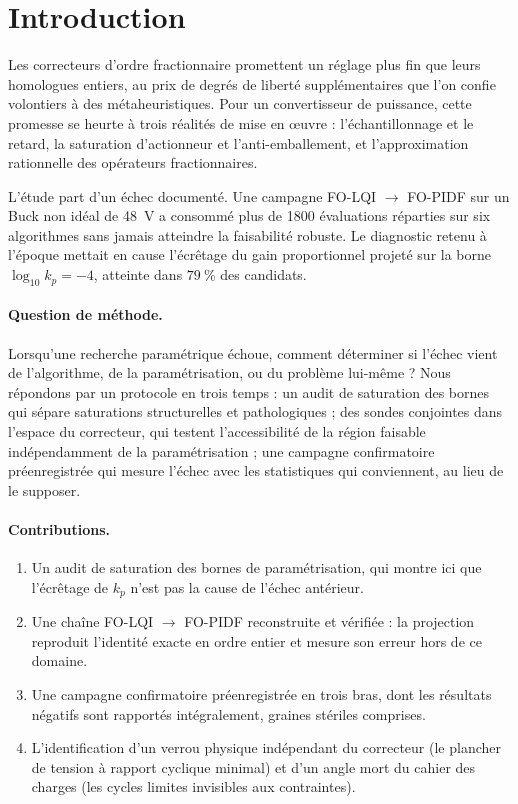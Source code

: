 \section{Introduction}
\label{sec:intro}

Les correcteurs d'ordre fractionnaire promettent un réglage plus fin que leurs
homologues entiers, au prix de degrés de liberté supplémentaires que l'on
confie volontiers à des métaheuristiques. Pour un convertisseur de puissance,
cette promesse se heurte à trois réalités de mise en œuvre : l'échantillonnage
et le retard, la saturation d'actionneur et l'anti-emballement, et
l'approximation rationnelle des opérateurs fractionnaires.

L'étude part d'un échec documenté. Une campagne FO-LQI $\to$ FO-PIDF sur un
Buck non idéal de 48~V a consommé plus de 1800 évaluations réparties sur six
algorithmes sans jamais atteindre la faisabilité robuste. Le diagnostic
retenu à l'époque mettait en cause l'écrêtage du gain proportionnel projeté
sur la borne $\log_{10}k_p=-4$, atteinte dans $79~\%$ des candidats.

\paragraph{Question de méthode.}
Lorsqu'une recherche paramétrique échoue, comment déterminer si l'échec
vient de l'algorithme, de la paramétrisation, ou du problème lui-même ? Nous
répondons par un protocole en trois temps : un audit de saturation des bornes
qui sépare saturations structurelles et pathologiques ; des sondes conjointes
dans l'espace du correcteur, qui testent l'accessibilité de la région
faisable indépendamment de la paramétrisation ; une campagne confirmatoire
préenregistrée qui mesure l'échec avec les statistiques qui conviennent, au
lieu de le supposer.

\paragraph{Contributions.}
\begin{enumerate}
\item Un audit de saturation des bornes de paramétrisation, qui montre ici
  que l'écrêtage de $k_p$ n'est pas la cause de l'échec antérieur.
\item Une chaîne FO-LQI $\to$ FO-PIDF reconstruite et vérifiée : la
  projection reproduit l'identité exacte en ordre entier et mesure son
  erreur hors de ce domaine.
\item Une campagne confirmatoire préenregistrée en trois bras, dont les
  résultats négatifs sont rapportés intégralement, graines stériles comprises.
\item L'identification d'un verrou physique indépendant du correcteur (le
  plancher de tension à rapport cyclique minimal) et d'un angle mort du
  cahier des charges (les cycles limites invisibles aux contraintes).
\end{enumerate}
